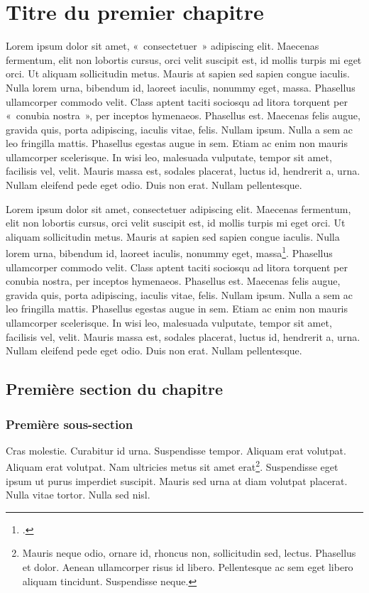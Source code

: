 
\clearemptydoublepage
\chapter{Titre du premier chapitre}

Lorem ipsum dolor sit amet, «~consectetuer~» adipiscing elit. Maecenas fermentum, elit non lobortis cursus, orci velit suscipit est, id mollis turpis mi eget orci. Ut aliquam sollicitudin metus. Mauris at sapien sed sapien congue iaculis. Nulla lorem urna, bibendum id, laoreet iaculis, nonummy eget, massa. Phasellus ullamcorper commodo velit. Class aptent taciti sociosqu ad litora torquent per «~conubia nostra~», per inceptos hymenaeos. Phasellus est. Maecenas felis augue, gravida quis, porta adipiscing, iaculis vitae, felis. Nullam ipsum. Nulla a sem ac leo fringilla mattis. Phasellus egestas augue in sem. Etiam ac enim non mauris ullamcorper scelerisque. In wisi leo, malesuada vulputate, tempor sit amet, facilisis vel, velit. Mauris massa est, sodales placerat, luctus id, hendrerit a, urna. Nullam eleifend pede eget odio. Duis non erat. Nullam pellentesque.

Lorem ipsum dolor sit amet, consectetuer adipiscing elit. Maecenas fermentum, elit non lobortis cursus, orci velit suscipit est, id mollis turpis mi eget orci. Ut aliquam sollicitudin metus. Mauris at sapien sed sapien congue iaculis. Nulla lorem urna, bibendum id, laoreet iaculis, nonummy eget, massa\footcite[12]{Pierre1901}. Phasellus ullamcorper commodo velit. Class aptent taciti sociosqu ad litora torquent per conubia nostra, per inceptos hymenaeos. Phasellus est. Maecenas felis augue, gravida quis, porta adipiscing, iaculis vitae, felis. Nullam ipsum. Nulla a sem ac leo fringilla mattis. Phasellus egestas augue in sem. Etiam ac enim non mauris ullamcorper scelerisque. In wisi leo, malesuada vulputate, tempor sit amet, facilisis vel, velit. Mauris massa est, sodales placerat, luctus id, hendrerit a, urna. Nullam eleifend pede eget odio. Duis non erat. Nullam pellentesque. 

\section{Première section du chapitre}

\subsection{Première sous-section}

Cras molestie. Curabitur id urna. Suspendisse tempor. Aliquam erat volutpat. Aliquam erat volutpat. Nam ultricies metus sit amet erat\footnote{Mauris neque odio, ornare id, rhoncus non, sollicitudin sed, lectus. Phasellus et dolor. Aenean ullamcorper risus id libero. Pellentesque ac sem eget libero aliquam tincidunt. Suspendisse neque.}. Suspendisse eget ipsum ut purus imperdiet suscipit. Mauris sed urna at diam volutpat placerat. Nulla vitae tortor. Nulla sed nisl.

